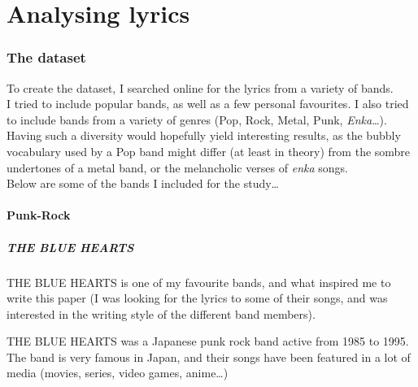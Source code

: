 
\renewcommand{\currentPart}{Analysing lyrics}
\part{Analysing lyrics}   \label{analysing-lyrics}




\section{The dataset}

To create the dataset, I searched online for the lyrics from a variety of bands. \\

I tried to include popular bands, as well as a few personal favourites. I also tried to include bands from a variety of genres (Pop, Rock, Metal, Punk, \emph{Enka}\dots). \\

Having such a diversity would hopefully yield interesting results, as the bubbly vocabulary used by a Pop band might differ (at least in theory) from the sombre undertones of a metal band, or the melancholic verses of \emph{enka} songs. \\

Below are some of the bands I included for the study\dots \\


\subsection{Punk-Rock}

\subsubsection{THE BLUE HEARTS} \label{{THE BLUE HEARTS}}

THE BLUE HEARTS is one of my favourite bands, and what inspired me to write this paper (I was looking for the lyrics to some of their songs, and was interested in the writing style of the different band members). \\

\bigskip

THE BLUE HEARTS was a Japanese punk rock band active from 1985 to 1995. The band is very famous in Japan, and their songs have been featured in a lot of media (movies, series, video games, anime\dots) \\

